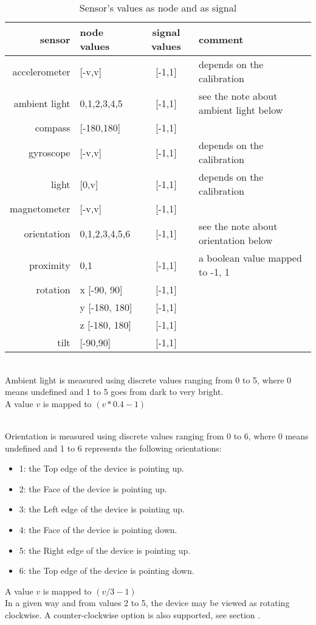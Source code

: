 \begin{table*}[htbp]
\begin{center}
\begin{tabular}{rlcl}
\hline
sensor & node values	&	signal values 	&  comment \\
\hline
accelerometer	& [-v,v]				& [-1,1] 		& depends on the calibration\\
ambient light	& {0,1,2,3,4,5}		& [-1,1] 		& see the note about ambient light below\\
compass			& [-180,180]		& [-1,1] 		& \\
gyroscope		& [-v,v]			& [-1,1] 		& depends on the calibration		\\
light			& [0,v]				& [-1,1] 		& depends on the calibration		\\
magnetometer	& [-v,v]			& [-1,1] 		& \\
orientation		& {0,1,2,3,4,5,6}	& [-1,1] 		& see the note about orientation below\\
proximity		& {0,1}				& [-1,1] 		& a boolean value mapped to -1, 1 \\
rotation		& x [-90, 90]		& [-1,1] 		& \\
				& y [-180, 180]		& [-1,1] 		& \\
				& z [-180, 180]		& [-1,1] 		& \\
tilt			& [-90,90] 			& [-1,1] 		& \\
\hline
\end{tabular}
\end{center}
\caption{Sensor's values as node and as signal}
\end{table*}


\\
Ambient light is measured using discrete values ranging from 0 to 5, where 0 means undefined and 1 to 5 goes from dark to very bright. \\
A value $v$ is mapped to $(v * 0.4 - 1)$

\\
Orientation is measured using discrete values ranging from 0 to 6, where 0 means undefined and 1 to 6 represents the following orientations:
\begin{itemize}
\item 1: the Top edge of the device is pointing up.
\item 2: the Face of the device is pointing up.
\item 3: the Left edge of the device is pointing up. 
\item 4: the Face of the device is pointing down.
\item 5: the Right edge of the device is pointing up.
\item 6: the Top edge of the device is pointing down.
\end{itemize}
A value $v$ is mapped to $(v / 3 - 1)$\\
In a given way and from values 2 to 5, the device may be viewed as rotating clockwise. A counter-clockwise option is also supported, see section .


